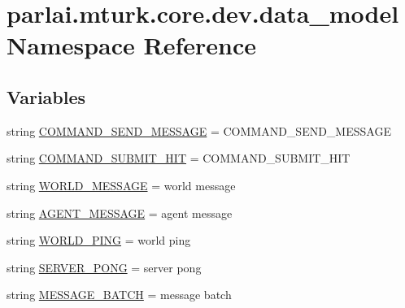 \hypertarget{namespaceparlai_1_1mturk_1_1core_1_1dev_1_1data__model}{}\section{parlai.\+mturk.\+core.\+dev.\+data\+\_\+model Namespace Reference}
\label{namespaceparlai_1_1mturk_1_1core_1_1dev_1_1data__model}
\subsection*{Variables}
\begin{DoxyCompactItemize}
\item 
string \hyperlink{namespaceparlai_1_1mturk_1_1core_1_1dev_1_1data__model_a064ebcd572d49644b13b594a2aff6739}{C\+O\+M\+M\+A\+N\+D\+\_\+\+S\+E\+N\+D\+\_\+\+M\+E\+S\+S\+A\+GE} = \textquotesingle{}C\+O\+M\+M\+A\+N\+D\+\_\+\+S\+E\+N\+D\+\_\+\+M\+E\+S\+S\+A\+GE\textquotesingle{}
\item 
string \hyperlink{namespaceparlai_1_1mturk_1_1core_1_1dev_1_1data__model_aaed745795a975324feb21bc095e8851d}{C\+O\+M\+M\+A\+N\+D\+\_\+\+S\+U\+B\+M\+I\+T\+\_\+\+H\+IT} = \textquotesingle{}C\+O\+M\+M\+A\+N\+D\+\_\+\+S\+U\+B\+M\+I\+T\+\_\+\+H\+IT\textquotesingle{}
\item 
string \hyperlink{namespaceparlai_1_1mturk_1_1core_1_1dev_1_1data__model_a8a1348f88e278fb665920dd44faf463a}{W\+O\+R\+L\+D\+\_\+\+M\+E\+S\+S\+A\+GE} = \textquotesingle{}world message\textquotesingle{}
\item 
string \hyperlink{namespaceparlai_1_1mturk_1_1core_1_1dev_1_1data__model_ad5acc9624a7a2a7c6501bba2ab540ede}{A\+G\+E\+N\+T\+\_\+\+M\+E\+S\+S\+A\+GE} = \textquotesingle{}agent message\textquotesingle{}
\item 
string \hyperlink{namespaceparlai_1_1mturk_1_1core_1_1dev_1_1data__model_abc5631a3698501496fc10cb9513315ca}{W\+O\+R\+L\+D\+\_\+\+P\+I\+NG} = \textquotesingle{}world ping\textquotesingle{}
\item 
string \hyperlink{namespaceparlai_1_1mturk_1_1core_1_1dev_1_1data__model_aeda0e6561c3b5224b7985d7a0f8ec000}{S\+E\+R\+V\+E\+R\+\_\+\+P\+O\+NG} = \textquotesingle{}server pong\textquotesingle{}
\item 
string \hyperlink{namespaceparlai_1_1mturk_1_1core_1_1dev_1_1data__model_a355847ff7e3cb92b6da7e529fec83aad}{M\+E\+S\+S\+A\+G\+E\+\_\+\+B\+A\+T\+CH} = \textquotesingle{}message batch\textquotesingle{}
\item 

\end{DoxyCompactItemize}
